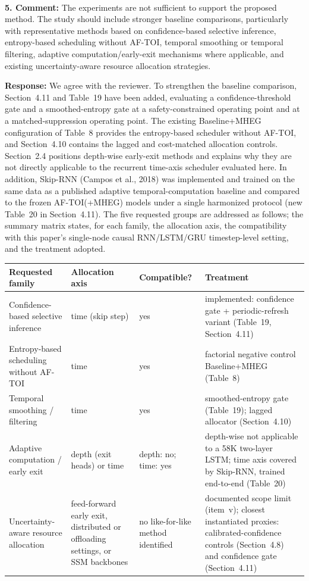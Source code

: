 \documentclass[1p,12pt,authoryear]{elsarticle}
\begin{document}
~

\noindent \textbf{5. Comment:} The experiments are not sufficient to support the proposed method. The study should include stronger baseline comparisons, particularly with representative methods based on confidence-based selective inference, entropy-based scheduling without AF-TOI, temporal smoothing or temporal filtering, adaptive computation/early-exit mechanisms where applicable, and existing uncertainty-aware resource allocation strategies.

\vspace{2mm}
\noindent \textbf{Response:} We agree with the reviewer. To strengthen the baseline comparison, Section~4.11 and Table~19 have been added, evaluating a confidence-threshold gate and a smoothed-entropy gate at a safety-constrained operating point and at a matched-suppression operating point. The existing Baseline+MHEG configuration of Table~8 provides the entropy-based scheduler without AF-TOI, and Section~4.10 contains the lagged and cost-matched allocation controls. Section~2.4 positions depth-wise early-exit methods and explains why they are not directly applicable to the recurrent time-axis scheduler evaluated here. In addition, Skip-RNN (Campos et al., 2018) was implemented and trained on the same data as a published adaptive temporal-computation baseline and compared to the frozen AF-TOI(+MHEG) models under a single harmonized protocol (new Table~20 in Section~4.11). The five requested groups are addressed as follows; the summary matrix
states, for each family, the allocation axis, the compatibility with this
paper's single-node causal RNN/LSTM/GRU timestep-level setting, and the
treatment adopted.

\begin{center}\footnotesize
\begin{tabular}{p{3.3cm} p{2.5cm} p{2.3cm} p{4.8cm}}
\hline
\textbf{Requested family} & \textbf{Allocation axis} & \textbf{Compatible?} & \textbf{Treatment} \\
\hline
Confidence-based selective inference & time (skip step) & yes & implemented: confidence gate + periodic-refresh variant (Table~19, Section~4.11) \\
Entropy-based scheduling without AF-TOI & time & yes & factorial negative control Baseline+MHEG (Table~8) \\
Temporal smoothing / filtering & time & yes & smoothed-entropy gate (Table~19); lagged allocator (Section~4.10) \\
Adaptive computation / early exit & depth (exit heads) or time & depth: no; time: yes & depth-wise not applicable to a 58K two-layer LSTM; time axis covered by Skip-RNN, trained end-to-end (Table~20) \\
Uncertainty-aware resource allocation & feed-forward early exit, distributed or offloading settings, or SSM backbones & no like-for-like method identified & documented scope limit (item~v); closest instantiated proxies: calibrated-confidence controls (Section~4.8) and confidence gate (Section~4.11) \\
\hline
\end{tabular}
\end{center}
\end{document}
